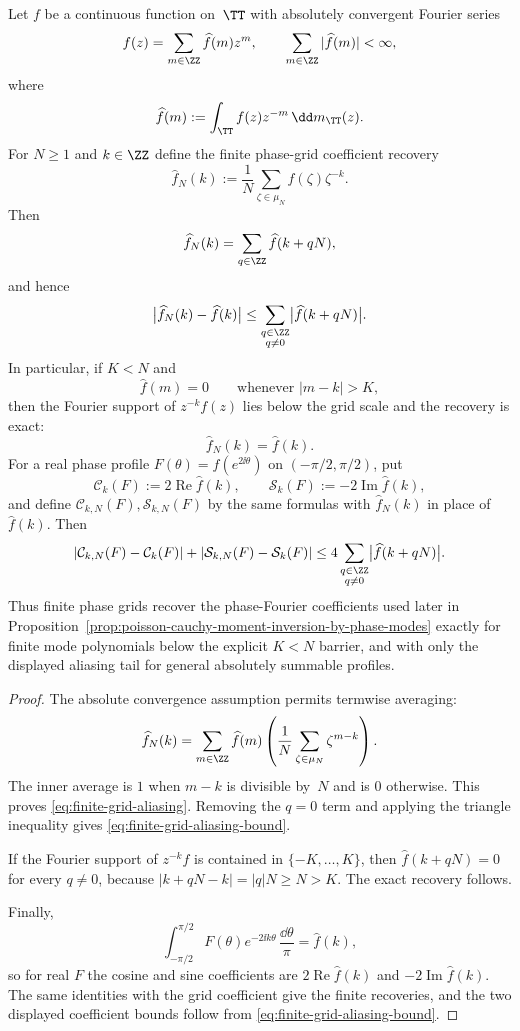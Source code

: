 \begin{proposition}%
\label{prop:finite-grid-coefficient-recovery}
Let $f$ be a continuous function on~$\TT$ with absolutely convergent
Fourier series
\[
f(z)=\sum_{m\in\ZZ}\widehat f(m)z^m,
\qquad
\sum_{m\in\ZZ}|\widehat f(m)|<\infty,
\]
where
\[
\widehat f(m):=\int_{\TT}f(z)z^{-m}\,\dd m_{\TT}(z).
\]
For $N\ge1$ and $k\in\ZZ$ define the finite phase-grid coefficient recovery
\[
\widehat f_N(k):=\frac1N\sum_{\zeta\in\mu_N}f(\zeta)\zeta^{-k}.
\]
Then
\begin{equation}\label{eq:finite-grid-aliasing}
\widehat f_N(k)=\sum_{q\in\ZZ}\widehat f(k+qN),
\end{equation}
and hence
\begin{equation}\label{eq:finite-grid-aliasing-bound}
\bigl|\widehat f_N(k)-\widehat f(k)\bigr|
\le
\sum_{\substack{q\in\ZZ\\q\ne0}}\bigl|\widehat f(k+qN)\bigr|.
\end{equation}
In particular, if $K<N$ and
\[
\widehat f(m)=0\qquad\text{whenever } |m-k|>K,
\]
then the Fourier support of $z^{-k}f(z)$ lies below the grid scale and the
recovery is exact:
\[
\widehat f_N(k)=\widehat f(k).
\]
For a real phase profile $F(\theta)=f(e^{2\ii\theta})$ on
$(-\pi/2,\pi/2)$, put
\[
\mathcal C_k(F):=2\operatorname{Re}\widehat f(k),
\qquad
\mathcal S_k(F):=-2\operatorname{Im}\widehat f(k),
\]
and define $\mathcal C_{k,N}(F),\mathcal S_{k,N}(F)$ by the same formulas
with $\widehat f_N(k)$ in place of $\widehat f(k)$.  Then
\[
|\mathcal C_{k,N}(F)-\mathcal C_k(F)|
+|\mathcal S_{k,N}(F)-\mathcal S_k(F)|
\le
4\sum_{\substack{q\in\ZZ\\q\ne0}}\bigl|\widehat f(k+qN)\bigr|.
\]
Thus finite phase grids recover the phase-Fourier coefficients used later
in Proposition~\ref{prop:poisson-cauchy-moment-inversion-by-phase-modes}
exactly for finite mode polynomials below the explicit $K<N$ barrier, and
with only the displayed aliasing tail for general absolutely summable
profiles.
\end{proposition}

\begin{proof}
The absolute convergence assumption permits termwise averaging:
\[
\widehat f_N(k)
=\sum_{m\in\ZZ}\widehat f(m)
\left(\frac1N\sum_{\zeta\in\mu_N}\zeta^{m-k}\right).
\]
The inner average is $1$ when $m-k$ is divisible by~$N$ and is $0$
otherwise.  This proves \eqref{eq:finite-grid-aliasing}.  Removing the
$q=0$ term and applying the triangle inequality gives
\eqref{eq:finite-grid-aliasing-bound}.

If the Fourier support of $z^{-k}f$ is contained in $\{-K,\dots,K\}$, then
$\widehat f(k+qN)=0$ for every $q\ne0$, because
$|k+qN-k|=|q|N\ge N>K$.  The exact recovery follows.

Finally,
\[
\int_{-\pi/2}^{\pi/2}F(\theta)e^{-2\ii k\theta}\,\frac{\dd\theta}{\pi}
=\widehat f(k),
\]
so for real $F$ the cosine and sine coefficients are
$2\operatorname{Re}\widehat f(k)$ and $-2\operatorname{Im}\widehat f(k)$.
The same identities with the grid coefficient give the finite recoveries, and
the two displayed coefficient bounds follow from
\eqref{eq:finite-grid-aliasing-bound}.
\end{proof}
